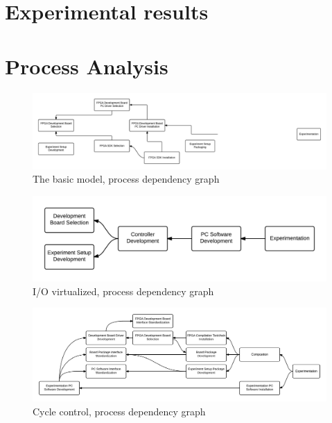 \documentclass[openright]{uva-bachelor-thesis}
\begin{document}
\chapter{Experimental results}

\appendix

\chapter{Process Analysis}

\begin{figure}[h]
\centering
\includegraphics[width=\textwidth]{processes-dependencies-basic}
\caption{The basic model, process dependency graph}
\label{fig:dependencies-basic}
\end{figure}

\begin{figure}[h]
\centering
\includegraphics[width=\textwidth]{processes-dependencies-inout}
\caption{I/O virtualized, process dependency graph}
\label{fig:dependencies-inout}
\end{figure}

\begin{landscape}
\begin{figure}
\centering
\includegraphics[width=\hsize]{processes-dependencies-control}
\caption{Cycle control, process dependency graph}
\label{fig:dependencies-control}
\end{figure}
\end{landscape}
\end{document}
